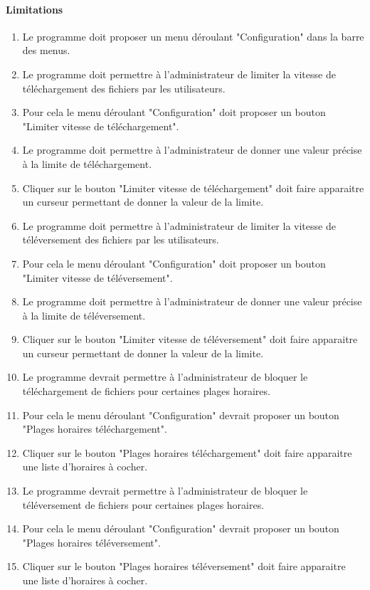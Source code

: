 \documentclass[10pt,a4paper]{report}
\begin{document}
\paragraph{Limitations}
	\begin{enumerate}
		\item Le programme doit proposer un menu déroulant "Configuration" dans la barre des menus.
		\item Le programme doit permettre à l'administrateur de limiter la vitesse de téléchargement des fichiers par les utilisateurs. 
		\item Pour cela le menu déroulant "Configuration" doit proposer un bouton "Limiter vitesse de téléchargement". 
		\item Le programme doit permettre à l'administrateur de donner une valeur précise à la limite de téléchargement. 
		\item Cliquer sur le bouton "Limiter vitesse de téléchargement" doit faire apparaitre un curseur permettant de donner la valeur de la limite.
		\item Le programme doit permettre à l'administrateur de limiter la vitesse de téléversement des fichiers par les utilisateurs.
		\item Pour cela le menu déroulant "Configuration" doit proposer un bouton "Limiter vitesse de téléversement".
		\item Le programme doit permettre à l'administrateur de donner une valeur précise à la limite de téléversement.
		\item Cliquer sur le bouton "Limiter vitesse de téléversement" doit faire apparaitre un curseur permettant de donner la valeur de la limite.
		\item Le programme devrait permettre à l'administrateur de bloquer le téléchargement de fichiers pour certaines plages horaires.
		\item Pour cela le menu déroulant "Configuration" devrait proposer un bouton "Plages horaires téléchargement".
		\item Cliquer sur le bouton "Plages horaires téléchargement" doit faire apparaitre une liste d'horaires à cocher.
		\item Le programme devrait permettre à l'administrateur de bloquer le téléversement de fichiers pour certaines plages horaires.
		\item Pour cela le menu déroulant "Configuration" devrait proposer un bouton "Plages horaires téléversement".
		\item Cliquer sur le bouton "Plages horaires téléversement" doit faire apparaitre une liste d'horaires à cocher.

\end{enumerate}
\end{document}
